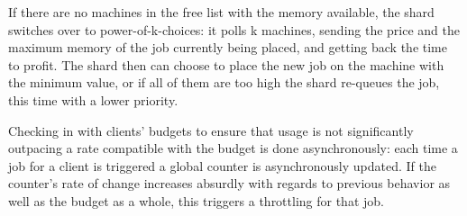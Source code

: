 If there are no machines in the free list with the memory available, the shard
switches over to power-of-k-choices: it polls k machines, sending the price and
the maximum memory of the job currently being placed, and getting back the time
to profit. The shard then can choose to place the new job on the machine with
the minimum value, or if all of them are too high the shard re-queues the job,
this time with a lower priority.

Checking in with clients' budgets to ensure that usage is not significantly
outpacing a rate compatible with the budget is done asynchronously: each time a
job for a client is triggered a global counter is asynchronously updated. If the
counter's rate of change increases absurdly with regards to previous behavior as
well as the budget as a whole, this triggers a throttling for that job.
